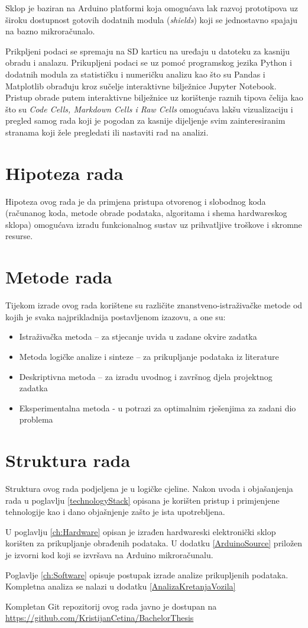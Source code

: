 Sklop je baziran na Arduino platformi koja omogućava lak razvoj prototipova uz široku dostupnost gotovih dodatnih modula (\textit{shields}) koji se jednostavno spajaju na bazno mikroračunalo.

Prikpljeni podaci se spremaju na SD karticu na uređaju u datoteku za kasniju obradu i analazu.
Prikupljeni podaci se uz pomoć programskog jezika Python i dodatnih modula za statističku i numeričku analizu kao što su Pandas i Matplotlib obrađuju kroz sučelje interaktivne bilježnice Jupyter Notebook.
Pristup obrade putem interaktivne bilježnice uz korištenje raznih tipova čelija kao što su \textit{Code Cells, Markdown Cells i Raw Cells} omogućava lakšu vizualizaciju i pregled samog rada koji je pogodan za kasnije dijeljenje svim zainteresiranim stranama koji žele pregledati ili nastaviti rad na analizi.

\section{Hipoteza rada}
Hipoteza ovog rada je da primjena pristupa otvorenog i slobodnog koda (računanog koda, metode obrade podataka, algoritama i shema hardwareskog sklopa) omogućava izradu funkcionalnog sustav uz prihvatljive troškove i skromne resurse.

\section{Metode rada}
Tijekom izrade ovog rada korištene su različite znanstveno-istraživačke metode od kojih je svaka najprikladnija postavljenom izazovu, a one su:
\begin{itemize}
\item Istraživačka metoda – za stjecanje uvida u zadane okvire zadatka
\item Metoda logičke analize i sinteze – za prikupljanje podataka iz literature
\item Deskriptivna metoda – za izradu uvodnog i završnog djela projektnog zadatka
\item Eksperimentalna metoda - u potrazi za optimalnim rješenjima za zadani dio problema
\end{itemize}

\section{Struktura rada}
Struktura ovog rada podjeljena je u logičke cjeline.
Nakon uvoda i objašanjenja rada u poglavlju \ref{technologyStack} opisana je korišten pristup i primjenjene tehnologije kao i dano objašnjenje zašto je ista upotrebljena.

U poglavlju \ref{ch:Hardware} opisan je izrađen hardwareski elektronički sklop korišten za prikupljanje obrađenih podataka.
U dodatku \ref{ArduinoSource} priložen je izvorni kod koji se izvršava na Arduino mikroračunalu.

Poglavlje \ref{ch:Software} opisuje postupak izrade analize prikupljenih podataka.
Kompletna analiza se nalazi u dodatku \ref{AnalizaKretanjaVozila}

Kompletan Git repozitorij ovog rada javno je dostupan na \url{https://github.com/KristijanCetina/BachelorThesis}